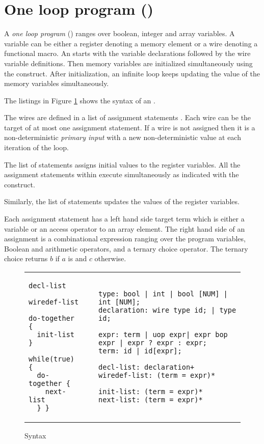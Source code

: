 \section{One loop program (\caig) }
\label{s:this}
A {\em one loop program} (\caig) ranges over boolean, 
integer and array variables. 
A variable can be either a register denoting a memory element or a wire denoting a functional macro.
An \caig starts with the variable declarations followed by the wire variable definitions. 
Then memory variables are initialized simultaneously using the  construct. 
After initialization, an infinite loop keeps updating the value of the memory variables simultaneously. 

The listings in Figure \ref{fig:gr} shows the syntax of an \caig. 

The wires are defined in a list of assignment statements . 
Each wire can be the target of at most one assignment statement. 
If a wire is not assigned then it is a non-deterministic {\em primary input}
with a new non-deterministic value at each iteration of the loop. 

The list of statements  assigns initial values to 
the register variables. All the assignment statements within  execute
simultaneously as indicated with the  construct.

Similarly, the  list of statements updates the values 
of the register variables. 

Each assignment statement has a left hand side target term 
which is either a variable or an access operator to an 
array element. 
The right hand side of an assignment is a combinational expression ranging over the program variables,  Boolean and arithmetic operators, and a ternary choice 
operator. The ternary choice  returns $b$ if $a$ 
is \true and $c$ otherwise. 

\begin{figure}
\begin{tabular}{p{3cm}p{0.5cm}p{12cm}}
\begin{lstlisting}
decl-list

wiredef-list

do-together {
  init-list }

while(true) {
  do-together {
    next-list
  } }
\end{lstlisting}
&
&
\begin{lstlisting}
type: bool | int | bool [NUM] | int [NUM]; 
declaration: wire type id; | type id;

expr: term | uop expr| expr bop expr | expr ? expr : expr;
term: id | id[expr]; 

decl-list: declaration+
wiredef-list: (term = expr)*

init-list: (term = expr)* 
next-list: (term = expr)* 
\end{lstlisting}
\end{tabular}
\caption{\caig Syntax}
\label{fig:gr}
\end{figure}
